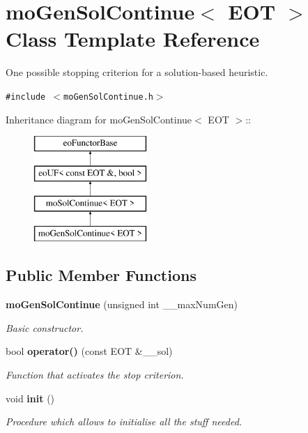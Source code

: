 \section{moGenSolContinue$<$ EOT $>$ Class Template Reference}
\label{classmo_gen_sol_continue}
One possible stopping criterion for a solution-based heuristic.  


{\tt \#include $<$moGenSolContinue.h$>$}

Inheritance diagram for moGenSolContinue$<$ EOT $>$::\begin{figure}[H]
\begin{center}
\leavevmode
\includegraphics[height=4cm]{classmo_gen_sol_continue}
\end{center}
\end{figure}
\subsection*{Public Member Functions}
\begin{CompactItemize}
\item 
{\bf moGenSolContinue} (unsigned int \_\-\_\-maxNumGen)
\begin{CompactList}\small\item\em Basic constructor. \item\end{CompactList}\item 
bool {\bf operator()} (const EOT \&\_\-\_\-sol)
\begin{CompactList}\small\item\em Function that activates the stop criterion. \item\end{CompactList}\item 
void {\bf init} ()\label{classmo_gen_sol_continue_6c5db8182157584b56507cc9075602d4}

\begin{CompactList}\small\item\em Procedure which allows to initialise all the stuff needed. \item\end{CompactList}\end{CompactItemize}
